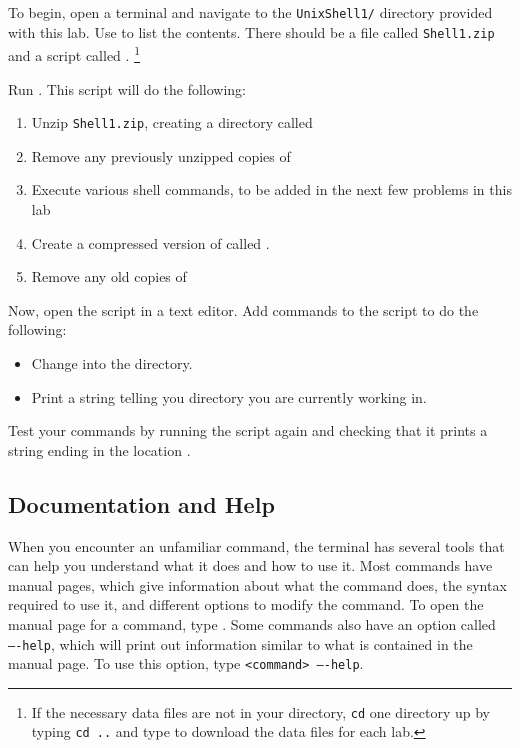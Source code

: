 \begin{problem}
To begin, open a terminal and navigate to the \texttt{UnixShell1/} directory provided with this lab.
Use  to list the contents.
There should be a file called \texttt{Shell1.zip} and a script called .
\footnote{If the necessary data files are not in your directory, \texttt{cd} one directory up by typing \texttt{cd ..} and type \footnotesize{} to download the data files for each lab.}

Run .
This script will do the following:
\begin{enumerate}
	\item Unzip \texttt{Shell1.zip}, creating a directory called 
	\item Remove any previously unzipped copies of 
	\item Execute various shell commands, to be added in the next few problems in this lab
	\item Create a compressed version of  called .
	\item Remove any old copies of 
\end{enumerate}

Now, open the  script in a text editor.
Add commands to the script to do the following:
\begin{itemize}
	\item Change into the  directory.
	\item Print a string telling you directory you are currently working in.
\end{itemize}

Test your commands by running the script again and checking that it prints a string ending in the location .
\label{problem:basic-commands}
\end{problem}

\subsection*{Documentation and Help} %
When you encounter an unfamiliar command, the terminal has several tools that can help you understand what it does and how to use it.
Most commands have manual pages, which give information about what the command does, the syntax required to use it, and different options to modify the command.
To open the manual page for a command, type .
Some commands also have an option called \texttt{----help}, which will print out information similar to what is contained in the manual page.
To use this option, type \texttt{<command> ----help}.


